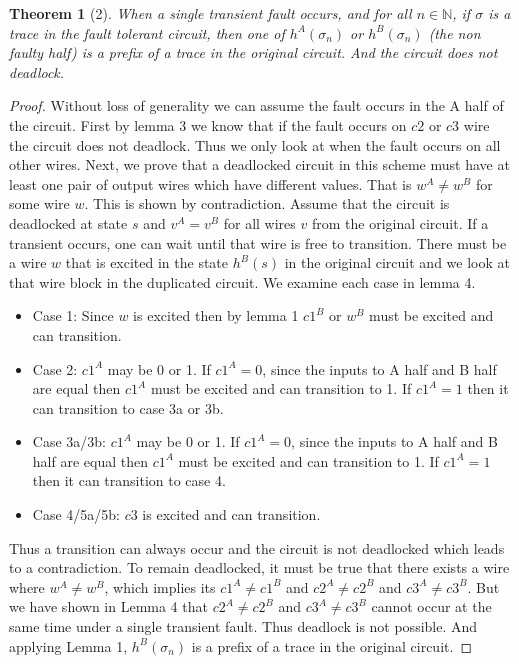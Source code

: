 \documentclass[12pt]{report}
\newtheorem*{theorem}{Theorem}
\begin{document}
\begin{theorem}[2]
When a single transient fault occurs, and for all $n \in \mathbb{N}$, if $\sigma$ is a trace in the fault tolerant circuit, then one of $h^{A}(\sigma_n)$ or $h^{B}(\sigma_n)$ (the non faulty half) is a prefix of a trace in the original circuit.  And the circuit does not deadlock.  
\end{theorem}
\begin{proof}
Without loss of generality we can assume the fault occurs in the A half of the circuit.  First by lemma 3 we know that if the fault occurs on $c2$ or $c3$ wire the circuit does not deadlock.  Thus we only look at when the fault occurs on all other wires. 
Next, we prove that a deadlocked circuit in this scheme must have at least one pair of output wires which have different values.  That is $w^A\neq w^B$ for some wire $w$.
This is shown by contradiction.  Assume that the circuit is deadlocked at state $s$ and $v^A = v^B$ for all wires $v$ from the original circuit.  If a transient occurs, one can wait until that wire is free to transition.  There
 must be a wire $w$ that is excited in the state $h^B(s)$ in the original circuit and we look at that wire block in the duplicated circuit.  We examine each case in lemma 4.
\begin{itemize}
	\item
	Case 1: Since $w$ is excited then by lemma 1 $c1^B$ or $w^B$ must be excited and can transition.
\item
Case 2:  $c1^A$ may be 0 or 1.  If $c1^A=0$, since the inputs to A half and B half are equal then $c1^A$ must be excited and can transition to 1.  If $c1^A=1$ then it can transition to case 3a or 3b.
\item
Case 3a/3b:  $c1^A$ may be 0 or 1.  If $c1^A=0$, since the inputs to A half and B half are equal then $c1^A$ must be excited and can transition to 1.  If $c1^A=1$ then it can transition to case 4.
\item
Case 4/5a/5b:  $c3$ is excited and can transition.
\end{itemize}
Thus a transition can always occur and the circuit is not deadlocked which leads to a contradiction.  To remain deadlocked, it must be true that there exists a wire where $w^A\neq w^B$, which implies its $c1^A\neq c1^B$ and $c2^A\neq c2^B$ and $c3^A\neq c3^B$.  But we have shown in Lemma 4 that $c2^A\neq c2^B$ and $c3^A\neq c3^B$ cannot occur at the same time under a single transient fault. Thus deadlock is not possible.  And applying Lemma 1, $h^B(\sigma_n)$ is a prefix of a trace in the original circuit. 
\end{proof}



%


\end{document}
